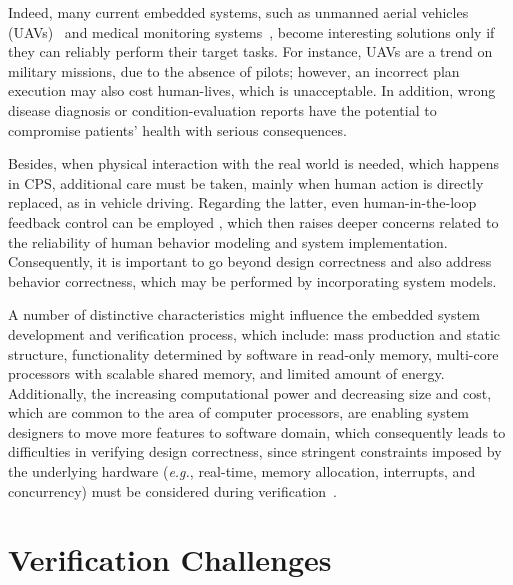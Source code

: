 \documentclass{acm_sen_article}
\begin{document}
Indeed, many current embedded systems, such as unmanned aerial vehicles (UAVs)~\cite{groza2015formal} and medical monitoring systems~\cite{Cordeiro09}, become interesting solutions only if they can reliably perform their target tasks. For instance, UAVs are a trend on military missions, due to the absence of pilots; however, an incorrect plan execution may also cost human-lives, which is unacceptable. In addition, wrong disease diagnosis or condition-evaluation reports have the potential to compromise patients' health with serious consequences.

Besides, when physical interaction with the real world is needed, which happens in CPS, additional care must be taken, mainly when human action is directly replaced, as in vehicle driving. Regarding the latter, even human-in-the-loop feedback control can be employed \cite{munir}, which then raises deeper concerns related to the reliability of human behavior modeling and system implementation. Consequently, it is important to go beyond design correctness and also address behavior correctness, which may be performed by incorporating system models.

A number of distinctive characteristics might influence the embedded system development and verification process, which include: mass production and static structure, functionality determined by software in read-only memory, multi-core processors with scalable shared memory, and limited amount of energy. Additionally, the increasing computational power and decreasing size and cost, which are common to the area of computer processors, are enabling system designers to move more features to software domain, which consequently leads to difficulties in verifying design correctness, since stringent constraints imposed by the underlying hardware ({\it e.g.}, real-time, memory allocation, interrupts, and concurrency) must be considered during verification~\cite{Kroening15}.

\section{Verification Challenges}
\end{document}
